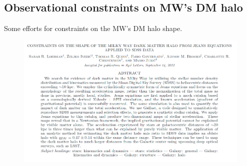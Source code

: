 \documentclass[xcolor=dvipsnames]{beamer}
\begin{document}
\subsection{Observational constraints on MW's DM halo}
\begin{frame}

Some efforts for constraints on the MW's DM halo shape. \cite{Loebman2012,LawMajewski2010,Vera-Ciro2013,}

\begin{figure}[c]
\includegraphics[width=1\linewidth]{./pics/loebmanJean.png}
\end{figure}


\end{frame}
\end{document}
